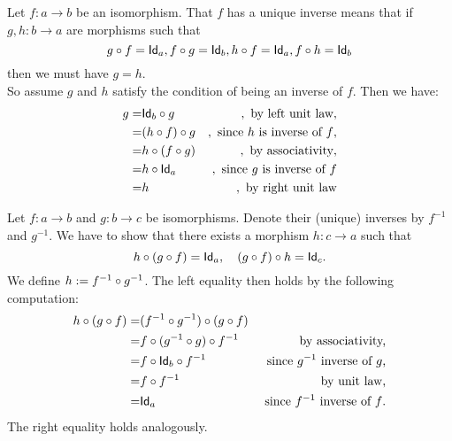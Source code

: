 \begin{solution}\label{sol:inverse_uniqueness}
Let $f:a\to b$ be an isomorphism. That $f$ has a unique inverse means that if $g,h : b\to a$ are morphisms such that 
\[
\co{f}{g} = \Id[a], \co{g}{f} = \Id[b], \co{f}{h} = \Id[a], \co{h}{f} = \Id[b]
\]
then we must have $g = h$.\\
So assume $g$ and $h$ satisfy the condition of being an inverse of $f$. Then we have:
\begin{eqnarray*}
g =& \co{g}{\Id[b]} &,\text{ by left unit law},\\
	=& \co{g}{(\co{f}{h})} &, \text{ since $h$ is inverse of $f$},\\
	=& \co{(\co{g}{f})}{h} &, \text{ by associativity},\\
	=& \co{\Id[a]}{h} &, \text{ since $g$ is inverse of $f$}\\
	=& h &, \text{ by right unit law}
\end{eqnarray*}
\end{solution}

\begin{solution}\label{sol:compofiso}
Let $f: a\to b$ and $g:b\to c$ be isomorphisms. Denote their (unique) inverses by $f^{-1}$ and $g^{-1}$. We have to show that there exists a morphism $h : c\to a$ such that 
\[
\co{(\co{f}{g})}{h} = \Id[a], \quad \co{h}{(\co{f}{g})} = \Id[c].
\]
We define $h := \co{g^{-1}}{f^{-1}}$. The left equality then holds by the following computation:
\begin{eqnarray*}
\co{(\co{f}{g})}{h} =& \co{(\co{f}{g})}{(\co{g^{-1}}{f^{-1}})} &\\
	=& \co{f^{-1}}{\co{(\co{g}{g^{-1}})}{f}} &\text{ by associativity,}\\
	=& \co{f^{-1}}{\co{\Id[b]}{f}} &\text{ since $g^{-1}$ inverse of $g$,}\\
	=& \co{f^{-1}}{f} &\text{ by unit law,}\\
	=& \Id[a] &\text{ since $f^{-1}$ inverse of $f$.}
\end{eqnarray*}
The right equality holds analogously.
\end{solution}



